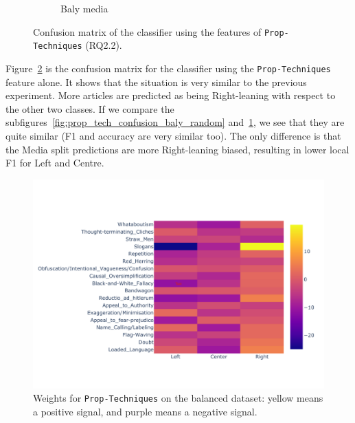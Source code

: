\begin{figure}[!htb]
\begin{subfigure}[b]{0.48\linewidth}
         \caption{Baly media}
         \label{fig:prop_tech_confusion_baly_media}
     \end{subfigure}
    \caption{Confusion matrix of the classifier using the features of \texttt{Prop-Techniques} (RQ2.2).}
    \label{fig:prop_tech_confusion}
\end{figure}


Figure~\ref{fig:prop_tech_confusion} is the confusion matrix for the classifier using the \texttt{Prop-Techniques} feature alone. It shows that the situation is very similar to the previous experiment. More articles are predicted as being Right-leaning with respect to the other two classes. %
If we compare the subfigures~\ref{fig:prop_tech_confusion_baly_random} and~\ref{fig:prop_tech_confusion_baly_media}, we see that they are quite similar (F1 and accuracy are very similar too). The only difference is that the Media split predictions are more Right-leaning biased, resulting in lower local F1 for Left and Centre.

\begin{figure}[!htb]
    \centering
    \includegraphics[width=\linewidth]{figures/nodes_stratifiedbalanced_weights_propaganda_percentages-small.pdf}
    \caption{Weights for \texttt{Prop-Techniques} on the balanced dataset: yellow means a positive signal, and purple means a negative signal.}
    \label{fig:prop_tech_weights}
\end{figure}

